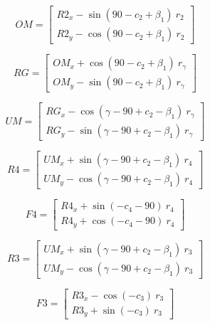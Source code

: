 \documentclass[10pt,a4paper]{article}
\begin{document}
\begin{multicols}{2}
\begin{equation}
OM = \begin{bmatrix}
R2_x - \sin(90- c_2 + \beta_1)~r_2 \\
R2_y - \cos(90- c_2 + \beta_1)~r_2
\end{bmatrix}
\end{equation}

\begin{equation}
RG = \begin{bmatrix}
OM_x + \cos(90- c_2 + \beta_1)~r_\gamma \\
OM_y - \sin(90- c_2 + \beta_1)~r_\gamma
\end{bmatrix}
\end{equation}

\begin{equation}
UM = \begin{bmatrix}
RG_x - \cos(\gamma - 90 + c_2 - \beta_1)~r_\gamma \\
RG_y - \sin(\gamma - 90 + c_2 - \beta_1)~r_\gamma
\end{bmatrix}
\end{equation}

\begin{equation}
R4 = \begin{bmatrix}
UM_x + \sin(\gamma - 90 + c_2 - \beta_1)~r_4 \\
UM_y - \cos(\gamma - 90 + c_2 - \beta_1)~r_4
\end{bmatrix}
\end{equation}

\begin{equation}
F4 = \begin{bmatrix}
R4_x + \sin(-c_4 -90)~r_4 \\
R4_y + \cos(-c_4 -90)~r_4
\end{bmatrix}
\end{equation}

\begin{equation}
R3 = \begin{bmatrix}
UM_x + \sin(\gamma - 90 + c_2 - \beta_1)~r_3 \\
UM_y - \cos(\gamma - 90 + c_2 - \beta_1)~r_3
\end{bmatrix}
\end{equation}

\begin{equation}
F3 = \begin{bmatrix}
R3_x - \cos(-c_3)~r_3 \\
R3_y + \sin(-c_3)~r_3
\end{bmatrix}
\end{equation}



\end{multicols}
\end{document}
